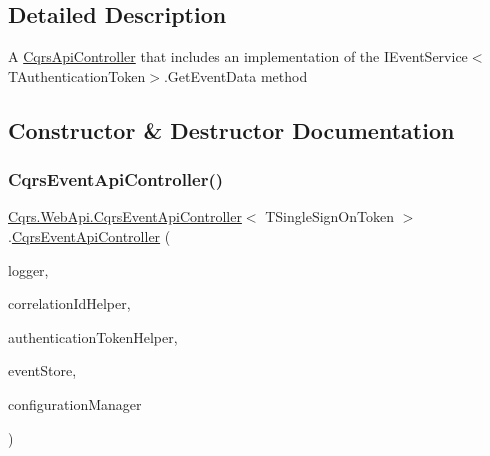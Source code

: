 \subsection{Detailed Description}
A \hyperlink{classCqrs_1_1WebApi_1_1CqrsApiController}{Cqrs\+Api\+Controller} that includes an implementation of the I\+Event\+Service$<$\+T\+Authentication\+Token$>$.\+Get\+Event\+Data method 



\subsection{Constructor \& Destructor Documentation}
\mbox{\label{classCqrs_1_1WebApi_1_1CqrsEventApiController_a5f1162d692213363fdcaf898f439f7dd_a5f1162d692213363fdcaf898f439f7dd}} 
\subsubsection{\texorpdfstring{Cqrs\+Event\+Api\+Controller()}{CqrsEventApiController()}}
{\footnotesize\ttfamily \hyperlink{classCqrs_1_1WebApi_1_1CqrsEventApiController}{Cqrs.\+Web\+Api.\+Cqrs\+Event\+Api\+Controller}$<$ T\+Single\+Sign\+On\+Token $>$.\hyperlink{classCqrs_1_1WebApi_1_1CqrsEventApiController}{Cqrs\+Event\+Api\+Controller} (\begin{DoxyParamCaption}\item[{I\+Logger}]{logger,  }\item[{I\+Correlation\+Id\+Helper}]{correlation\+Id\+Helper,  }\item[{\hyperlink{interfaceCqrs_1_1Authentication_1_1IAuthenticationTokenHelper}{I\+Authentication\+Token\+Helper}$<$ T\+Single\+Sign\+On\+Token $>$}]{authentication\+Token\+Helper,  }\item[{\hyperlink{interfaceCqrs_1_1Events_1_1IEventStore}{I\+Event\+Store}$<$ T\+Single\+Sign\+On\+Token $>$}]{event\+Store,  }\item[{\hyperlink{interfaceCqrs_1_1Configuration_1_1IConfigurationManager}{I\+Configuration\+Manager}}]{configuration\+Manager }\end{DoxyParamCaption})\hspace{0.3cm}{\ttfamily [protected]}}



